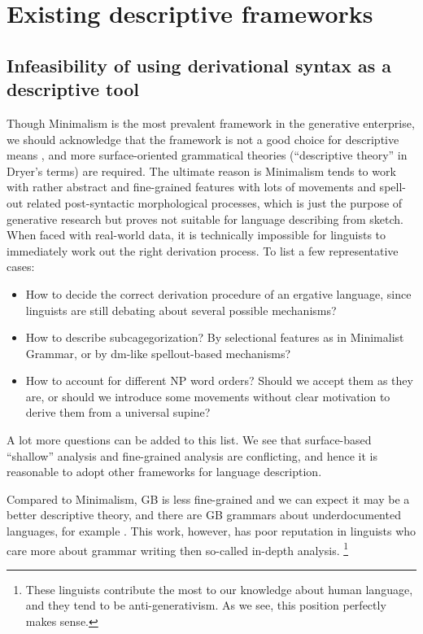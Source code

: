 \documentclass[../main.tex]{subfiles}
\begin{document}
\section{Existing descriptive frameworks}\label{sec:descriptive-framework}

\subsection{Infeasibility of using derivational syntax as a descriptive tool}\label{sec:generative-no-good}

Though Minimalism is the most prevalent framework in the generative enterprise, we should acknowledge that 
the framework is not a good choice for descriptive means \citep{dryer2006descriptive}, and more surface-oriented
grammatical theories (``descriptive theory'' in Dryer's terms) are required. The ultimate reason is 
Minimalism tends to work with rather abstract and fine-grained features with lots of movements and spell-out related post-syntactic morphological processes, 
which is just the purpose of generative research but proves not suitable for language describing from sketch.
When faced with real-world data, it is technically impossible for linguists to immediately work out the right derivation process. To list a few representative cases:
\begin{itemize}
    \item  How to decide the correct derivation procedure of an ergative language, since 
    linguists are still debating about several possible mechanisms?
    \item How to describe subcagegorization? By selectional features as in Minimalist Grammar,
    or by \ac{dm}-like spellout-based mechanisms\citep{siddiqi2009syntax}?
    \item How to account for different NP word orders? Should we accept them as they are, or should we introduce 
    some movements without clear motivation \citep{cinque2005deriving} to derive them from a universal supine?
\end{itemize}
A lot more questions can be added to this list. We see that surface-based ``shallow'' analysis and fine-grained 
analysis are conflicting, and hence it is reasonable to adopt other frameworks for language description.

Compared to Minimalism, GB is less fine-grained and we can expect it may be a better descriptive theory,
and there are GB grammars about underdocumented languages, for example \citet{holmer1996parametric}. 
This work, however, has poor reputation in linguists who care more about grammar writing then so-called in-depth
analysis.%
\footnote{
    These linguists contribute the most to our knowledge about human language, and they tend to 
    be anti-generativism. As we see, this position perfectly makes sense.
}
\end{document}
